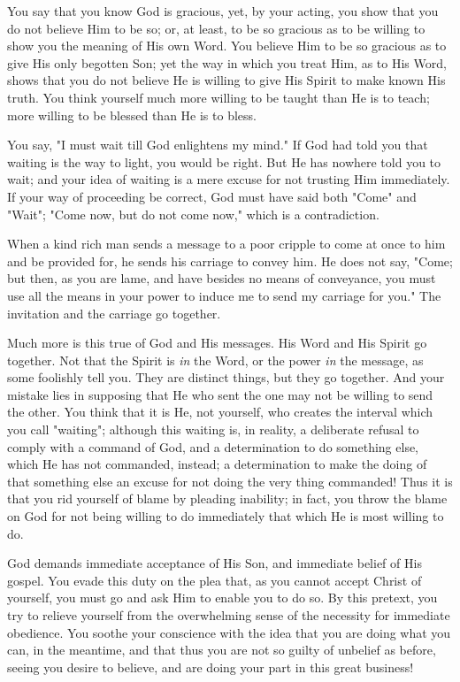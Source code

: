 \documentclass[
]{book}
\begin{document}
You say that you know God is gracious, yet, by your acting, you show that you do not believe Him to be so; or, at least, to be so gracious as to be willing to show you the meaning of His own Word. You believe Him to be so gracious as to give His only begotten Son; yet the way in which you treat Him, as to His Word, shows that you do not believe He is willing to give His Spirit to make known His truth. You think yourself much more willing to be taught than He is to teach; more willing to be blessed than He is to bless.

You say, "I must wait till God enlightens my mind." If God had told you that waiting is the way to light, you would be right. But He has nowhere told you to wait; and your idea of waiting is a mere excuse for not trusting Him immediately. If your way of proceeding be correct, God must have said both "Come" and "Wait"; "Come now, but do not come now," which is a contradiction.

When a kind rich man sends a message to a poor cripple to come at once to him and be provided for, he sends his carriage to convey him. He does not say, "Come; but then, as you are lame, and have besides no means of conveyance, you must use all the means in your power to induce me to send my carriage for you." The invitation and the carriage go together.

Much more is this true of God and His messages. His Word and His Spirit go together. Not that the Spirit is \emph{in} the Word, or the power \emph{in} the message, as some foolishly tell you. They are distinct things, but they go together. And your mistake lies in supposing that He who sent the one may not be willing to send the other. You think that it is He, not yourself, who creates the interval which you call "waiting"; although this waiting is, in reality, a deliberate refusal to comply with a command of God, and a determination to do something else, which He has not commanded, instead; a determination to make the doing of that something else an excuse for not doing the very thing commanded! Thus it is that you rid yourself of blame by pleading inability; in fact, you throw the blame on God for not being willing to do immediately that which He is most willing to do.

God demands immediate acceptance of His Son, and immediate belief of His gospel. You evade this duty on the plea that, as you cannot accept Christ of yourself, you must go and ask Him to enable you to do so. By this pretext, you try to relieve yourself from the overwhelming sense of the necessity for immediate obedience. You soothe your conscience with the idea that you are doing what you can, in the meantime, and that thus you are not so guilty of unbelief as before, seeing you desire to believe, and are doing your part in this great business!
\end{document}
